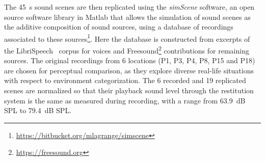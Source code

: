 \documentclass[twocolumn]{article}
\begin{document}
The 45~s sound scenes are then replicated using the  \textit{simScene} software, an open source software library in Matlab that allows the simulation of sound scenes as the additive composition of sound sources, using a database of recordings associated to these sources\footnote{\url{https://bitbucket.org/mlagrange/simscene}}. Here the database is constructed from excerpts of the LibriSpeech~\cite{panayotov2015} corpus for voices and Freesound\footnote{\url{https://freesound.org}} contributions for remaining sources. The original recordings from 6 locations (P1, P3, P4, P8, P15 and P18) are chosen for perceptual comparison, as they explore diverse real-life situations with respect to environment categorization. The 6 recorded and 19 replicated scenes are normalized so that their playback sound level through the restitution system is the same as measured during recording, with a range from 63.9~dB SPL to 79.4~dB SPL.
\end{document}
